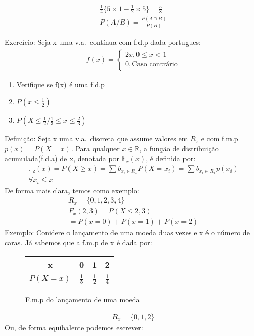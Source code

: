 \documentclass[11pt,a4paper]{book}
\begin{document}
\begin{enumerate}[label=(\alph*)]
\begin{enumerate}
\begin{enumerate}[label=(\alph*)]
\begin{align}
      \frac{1}{4}\{ 5\times 1- \frac{1}{2}\times 5\}= \frac{5}{8}\\
      P(A/B)=\frac{P(A\cap B)}{P(B)}
    \end{align}
\end{enumerate}
Exercício: Seja x uma v.a.\ contínua com f.d.p dada portugues:
\begin{align}
  f(x)= 
  \begin{cases}
    2x, 0\le x < 1 \\ 
    0, \text{Caso contrário}
  \end{cases}
\end{align}
\begin{enumerate}[label=(\alph*)]
  \item Verifique se f(x) é uma f.d.p
  \item$ P(x\le \frac{1}{2})$
  \item $P(X\le \frac{1}{2} / \frac{1}{3} \le x \le \frac{2}{3})$
\end{enumerate}
Definição: Seja x uma v.a.\ discreta que assume valores em $R_{x}$ e com f.m.p 
$p(x)=P(X=x)$. Para qualquer $x \in \mathbb{R}$, a função de distribuição 
acumulada(f.d.a) de x, denotada por $\mathbb{F}_{x}(x)$, é definida por: 
\begin{align}
  \mathbb{F_{x}}(x)=P(X \geq x )= \sum b_{x_{i} \in R_{x}} P(X=x_i) = \sum b_{x_{i} \in R_{x}} p(x_i) \\
  \forall x_i \le x \nonumber
\end{align}
De forma mais clara, temos como exemplo: 
\begin{align*}
  R_{x}= \{0,1,2,3,4 \}\\
  F_{x}(2,3)= P(X\le 2,3)\\
  = P(x=0)+P(x=1)+P(x=2)
\end{align*}
Exemplo: 
Conidere o lançamento de uma moeda duas vezes e x é o número de caras. Já sabemos
que a f.m.p de x é dada por:
\begin{figure} 
  \centering
  \begin{tabular}{c c c c}
    \toprule
    x&0&1&2\\ \midrule
    $P(X=x)$&$\frac{1}{5}$&$\frac{1}{2}$&$\frac{1}{4}$\\ \bottomrule
  \end{tabular}
  \label{fig:6}
  \caption{F.m.p do lançamento de uma moeda}
\end{figure}
\begin{align*}
  R_{x}=\{0,1,2\}
\end{align*}
Ou, de forma equibalente podemos escrever: 

\end{enumerate}
\end{enumerate}
\end{document}
